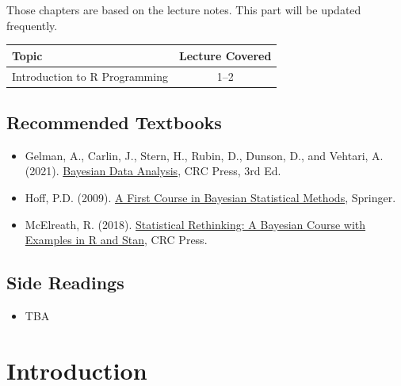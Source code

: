 \documentclass[
  letterpaper,
  DIV=11,
  numbers=noendperiod]{scrreprt}
\providecommand{\tightlist}{%
  \setlength{\itemsep}{0pt}\setlength{\parskip}{0pt}}
\begin{document}

Those chapters are based on the lecture notes. This part will be updated
frequently.

\begin{longtable}[]{@{}lc@{}}
\toprule\noalign{}
Topic & Lecture Covered \\
\midrule\noalign{}
\endhead
\bottomrule\noalign{}
\endlastfoot
Introduction to R Programming & 1--2 \\
\end{longtable}

\section*{Recommended Textbooks}\label{recommended-textbooks}


\begin{itemize}
\item
  Gelman, A., Carlin, J., Stern, H., Rubin, D., Dunson, D., and Vehtari,
  A. (2021).
  \href{https://sites.stat.columbia.edu/gelman/book/}{Bayesian Data
  Analysis}, CRC Press, 3rd Ed.
\item
  Hoff, P.D. (2009).
  \href{https://sites.math.rutgers.edu/~zeilberg/EM20/Hoff.pdf}{A First
  Course in Bayesian Statistical Methods}, Springer.
\item
  McElreath, R. (2018).
  \href{https://civil.colorado.edu/~balajir/CVEN6833/bayes-resources/RM-StatRethink-Bayes.pdf}{Statistical
  Rethinking: A Bayesian Course with Examples in R and Stan}, CRC Press.
\end{itemize}

\section*{Side Readings}\label{side-readings}


\begin{itemize}
\tightlist
\item
  TBA
\end{itemize}


\chapter{Introduction}\label{introduction}
\end{document}
